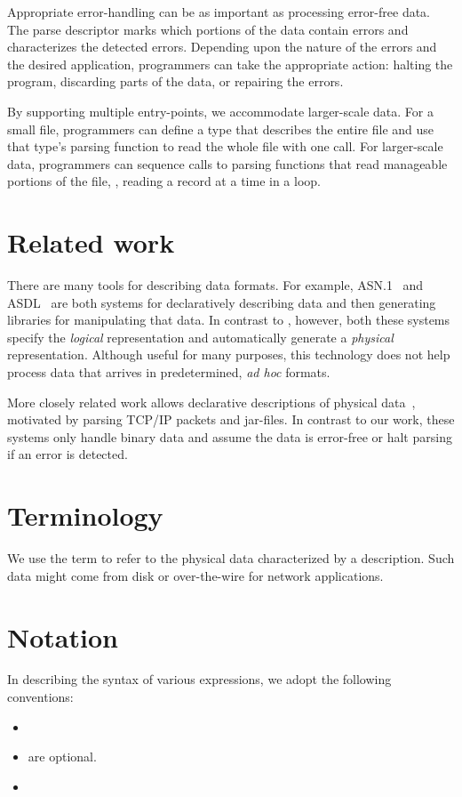 Appropriate error-handling can be as important as processing
error-free data.  The parse descriptor marks which portions of the
data contain errors and characterizes the detected errors.
Depending upon the nature of the errors and the desired application,
programmers can take the appropriate action: halting the program,
discarding parts of the data, or repairing the errors.

By supporting multiple entry-points, we accommodate larger-scale data.
For a small file, programmers can define a \padsl{} type that describes
the entire file and use that type's parsing function to read the whole
file with one call.  For larger-scale data, programmers can sequence
calls to parsing functions that read manageable portions of the file,
\eg{}, reading a record at a time in a loop.

\section{Related work}
There are many tools for describing data formats. For example,
\textsc{ASN.1}~\cite{asn} and \textsc{ASDL}~\cite{asdl} are both
systems for declaratively describing data and then generating
libraries for manipulating that data.  In contrast to \pads{},
however, both these systems specify the {\em logical\/} representation
and automatically generate a {\em physical\/} representation.
Although useful for many purposes, this technology does not help
process data that arrives in predetermined, \textit{ad hoc} formats.


More closely related work allows declarative descriptions of physical
data~\cite{sigcomm00,erlang-bit-syntax,gpce02}, motivated by parsing
\textsc{TCP/IP} packets and \java{} jar-files.  In contrast to our
work, these systems only handle binary data and assume the data is
error-free or halt parsing if an error is detected.  

\section{Terminology}
We use the term \textit{\external{}} to refer to the physical
data characterized by a \pads{} description.  Such data might 
come from disk or over-the-wire for network applications.

\section{Notation}
In describing the syntax of various \padsl{} expressions, we
adopt the following conventions:
\begin{itemize}
\item {}
\item {} are optional.
\item {}
\end{itemize}

